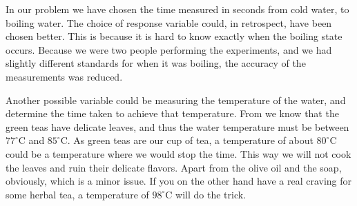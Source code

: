 In our problem we have chosen the time measured in seconds from cold water, to boiling water. The choice of response variable could, in retrospect, have been chosen better. This is because it is hard to know exactly when the boiling state occurs. Because we were two people performing the experiments, and we had slightly different standards for when it was boiling, the accuracy of the measurements was reduced.

Another possible variable could be measuring the temperature of the water, and determine the time taken to achieve that temperature. From \cite{teaTemperatures} we know that the green teas have delicate leaves, and thus the water temperature must be between $77 ^\circ$C and $85 ^\circ$C. As green teas are our cup of tea, a temperature of about $80 ^\circ$C could be a temperature where we would stop the time. This way we will not cook the leaves and ruin their delicate flavors. Apart from the olive oil and the soap, obviously, which is a minor issue. If you on the other hand have a real craving for some herbal tea, a temperature of $98 ^\circ$C will do the trick.